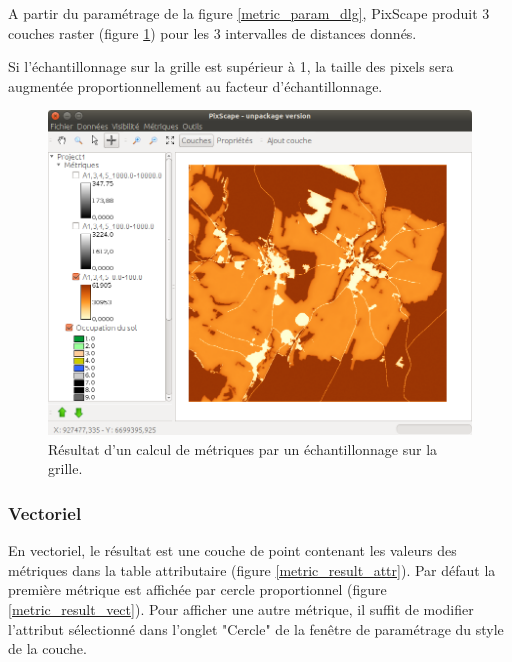 \documentclass{report}
\begin{document}
A partir du paramétrage de la figure \ref{metric_param_dlg}, PixScape produit 3 couches raster (figure \ref{metric_result_rast}) pour les 3 intervalles de distances donnés.

Si l'échantillonnage sur la grille est supérieur à 1, la taille des pixels sera augmentée proportionnellement au facteur d'échantillonnage.

\begin{figure}[H]
	\includegraphics[scale=0.5]{img/metric_result_rast-fr.png} 
	\caption{Résultat d'un calcul de métriques par un échantillonnage sur la grille.}
	\label{metric_result_rast}
\end{figure}

\subsubsection{Vectoriel}

En vectoriel, le résultat est une couche de point contenant les valeurs des métriques dans la table attributaire (figure \ref{metric_result_attr}). Par défaut la première métrique est affichée par cercle proportionnel (figure \ref{metric_result_vect}). Pour afficher une autre métrique, il suffit de modifier l'attribut sélectionné dans l'onglet "Cercle" de la fenêtre de paramétrage du style de la couche.
\end{document}
